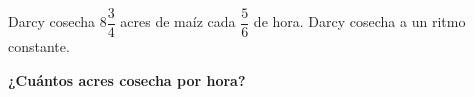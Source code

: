 Darcy cosecha $8\dfrac{3}{4}$ acres de maíz cada $\dfrac{5}{6}$ de hora. Darcy cosecha a un ritmo constante.

\textbf{¿Cuántos acres cosecha por hora?}

\begin{solutionbox}{1.5cm}

\end{solutionbox}